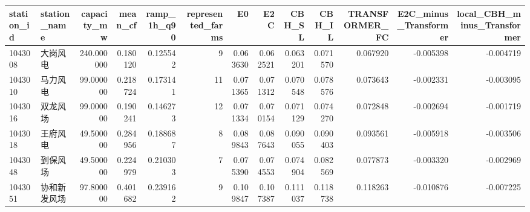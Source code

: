 \begin{tabular}{llrrrrrrrrrrr}
\toprule
station\_id & station\_name & capacity\_mw & mean\_cf & ramp\_1h\_q90 & represented\_farms & E0 & E2C & CBH\_SL & CBH\_IL & TRANSFORMER\_FC & E2C\_minus\_Transformer & local\_CBH\_minus\_Transformer \\
\midrule
1043008 & 大岗风电 & 240.000000 & 0.180120 & 0.125542 & 9 & 0.063630 & 0.062521 & 0.063201 & 0.071570 & 0.067920 & -0.005398 & -0.004719 \\
1043010 & 马力风电 & 99.000000 & 0.218724 & 0.173141 & 11 & 0.071365 & 0.071312 & 0.070548 & 0.078576 & 0.073643 & -0.002331 & -0.003095 \\
1043016 & 双龙风场 & 99.000000 & 0.190241 & 0.146273 & 12 & 0.071334 & 0.070154 & 0.071129 & 0.074270 & 0.072848 & -0.002694 & -0.001719 \\
1043018 & 王府风电 & 49.500000 & 0.284956 & 0.188687 & 8 & 0.089843 & 0.087643 & 0.090055 & 0.090403 & 0.093561 & -0.005918 & -0.003506 \\
1043048 & 到保风场 & 49.500000 & 0.224979 & 0.210303 & 7 & 0.075390 & 0.074553 & 0.074904 & 0.082569 & 0.077873 & -0.003320 & -0.002969 \\
1043051 & 协和新发风场 & 97.800000 & 0.401682 & 0.239162 & 9 & 0.109847 & 0.107387 & 0.111037 & 0.118738 & 0.118263 & -0.010876 & -0.007225 \\
\bottomrule
\end{tabular}
